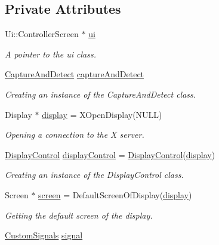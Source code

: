 \subsection*{Private Attributes}
\begin{DoxyCompactItemize}
\item 
Ui\+::\+Controller\+Screen $\ast$ \hyperlink{class_controller_screen_a25a37166616a171730a89ddb69c120f3}{ui}
\begin{DoxyCompactList}\small\item\em A pointer to the ui class. \end{DoxyCompactList}\item 
\hyperlink{class_gestro_1_1_capture_and_detect}{Capture\+And\+Detect} \hyperlink{class_controller_screen_a672477c37c55499b69e28da611e7313d}{capture\+And\+Detect}
\begin{DoxyCompactList}\small\item\em Creating an instance of the Capture\+And\+Detect class. \end{DoxyCompactList}\item 
Display $\ast$ \hyperlink{class_controller_screen_a240495b9e446bc512d8a7498b3f45981}{display} = X\+Open\+Display(N\+U\+LL)
\begin{DoxyCompactList}\small\item\em Opening a connection to the X server. \end{DoxyCompactList}\item 
\hyperlink{class_gestro_1_1_display_control}{Display\+Control} \hyperlink{class_controller_screen_a261f7eb9894dbcfdbddad62ad125e330}{display\+Control} = \hyperlink{class_gestro_1_1_display_control}{Display\+Control}(\hyperlink{class_controller_screen_a240495b9e446bc512d8a7498b3f45981}{display})
\begin{DoxyCompactList}\small\item\em Creating an instance of the Display\+Control class. \end{DoxyCompactList}\item 
Screen $\ast$ \hyperlink{class_controller_screen_ae667566a3438ae194170858cd328053e}{screen} = Default\+Screen\+Of\+Display(\hyperlink{class_controller_screen_a240495b9e446bc512d8a7498b3f45981}{display})
\begin{DoxyCompactList}\small\item\em Getting the default screen of the display. \end{DoxyCompactList}\item 
\hyperlink{struct_custom_signals}{Custom\+Signals} \hyperlink{class_controller_screen_afe5953fdc933fcc35cf0ef841c83f18c}{signal}

\end{DoxyCompactItemize}

